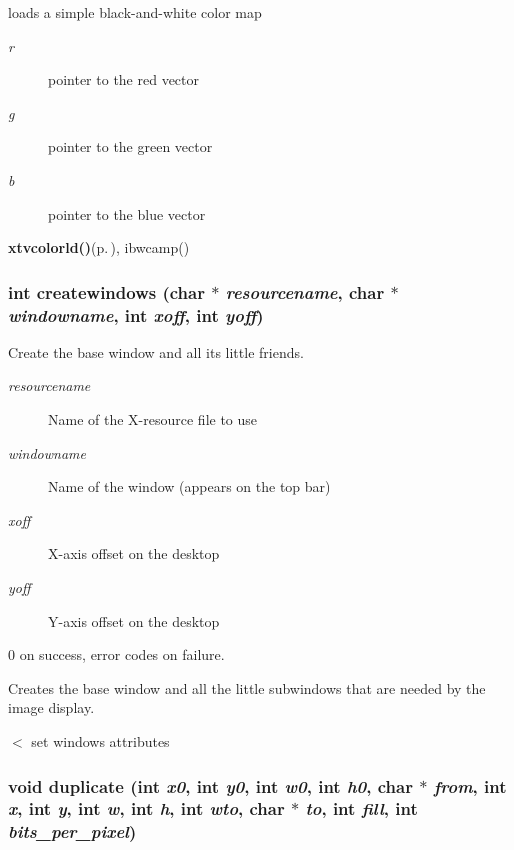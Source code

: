 loads a simple black-and-white color map 

\begin{Desc}
\item[Parameters:]
\begin{description}
\item[{\em r}]pointer to the red vector \item[{\em g}]pointer to the green vector \item[{\em b}]pointer to the blue vector\end{description}
\end{Desc}
\begin{Desc}
\item[See also:]{\bf xtvcolorld()}{\rm (p.\,\pageref{xtv_8c_a6})}, ibwcamp() \end{Desc}
\subsubsection{\setlength{\rightskip}{0pt plus 5cm}int createwindows (char $\ast$ {\em resourcename}, char $\ast$ {\em windowname}, int {\em xoff}, int {\em yoff})}\label{xtv_8h_a60}


Create the base window and all its little friends. 

\begin{Desc}
\item[Parameters:]
\begin{description}
\item[{\em resourcename}]Name of the X-resource file to use \item[{\em windowname}]Name of the window (appears on the top bar) \item[{\em xoff}]X-axis offset on the desktop \item[{\em yoff}]Y-axis offset on the desktop\end{description}
\end{Desc}
\begin{Desc}
\item[Returns:]0 on success, error codes on failure.\end{Desc}
Creates the base window and all the little subwindows that are needed by the image display.

$<$ set windows attributes 
\subsubsection{\setlength{\rightskip}{0pt plus 5cm}void duplicate (int {\em x0}, int {\em y0}, int {\em w0}, int {\em h0}, char $\ast$ {\em from}, int {\em x}, int {\em y}, int {\em w}, int {\em h}, int {\em wto}, char $\ast$ {\em to}, int {\em fill}, int {\em bits\_\-per\_\-pixel})}\label{xtv_8h_a122}



